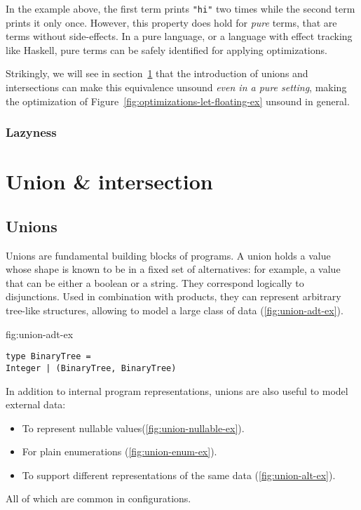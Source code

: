 \documentclass[sigplan,10pt,review,anonymous]{acmart}
\newcommand{\unsure}[2][1=]{}
\newcommand{\info}[2][1=]{}
\newcommand{\change}[2]{}
\newcommand{\nickel}[1]{\lstinline[language=nickel]{#1}}
\begin{document}
In the example above, the first term prints \nickel{"hi"} two times while the
second term prints it only once. However, this property does hold for
\emph{pure} terms, that are terms without side-effects. In a pure language, or a
language with effect tracking like Haskell, pure terms can be safely identified for applying
optimizations.

Strikingly, we will see in section~\ref{} that the introduction of unions and
intersections can make this equivalence  unsound \emph{even in a
pure setting}, making the optimization of
Figure~\ref{fig:optimizations-let-floating-ex} unsound in general.

\unsure{Should we tease already here that unions and intersections break this
even for pure terms?}

\subsubsection*{Lazyness}
\unsure{Should we talk about lazyness?
this would be a good place to introduce it}

\newpage

\section{Union \& intersection}
\info{What are they, what are they used for.}

\subsection*{Unions}
Unions are fundamental building blocks of programs. A union holds a value whose
shape is known to be in a fixed set of alternatives: for example, a value that
can be either a boolean or a string. They correspond logically to disjunctions.
Used in combination with products, they can represent arbitrary tree-like
structures, allowing to model a large class of data
(\ref{fig:union-adt-ex}).


\change{These next few labels need to be inside figures,
they are not working}
\label{fig:union-adt-ex}
\begin{lstlisting}[title={Tree-like data structure}]
type BinaryTree =
Integer | (BinaryTree, BinaryTree)
\end{lstlisting}


In addition to internal program representations, unions are also useful to model
external data:
\begin{itemize}
    \item To represent nullable values(\ref{fig:union-nullable-ex}).
    \item For plain enumerations (\ref{fig:union-enum-ex}).
    \item To support different representations of the same data
        (\ref{fig:union-alt-ex}).
\end{itemize}
All of which are common in configurations.
\end{document}
